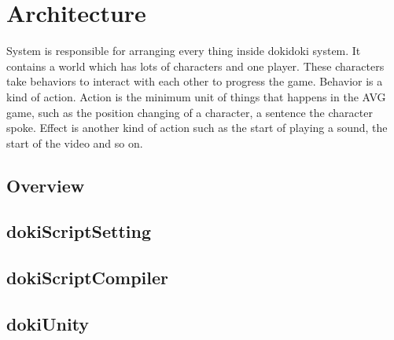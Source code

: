 \chapter{Architecture}

System is responsible for arranging every thing inside dokidoki system. It contains a world which has lots of characters and one player. These characters take behaviors to interact with each other to progress the game. Behavior is a kind of action. Action is the minimum unit of things that happens in the AVG game, such as the position changing of a character, a sentence the character spoke. Effect is another kind of action such as the start of playing a sound, the start of the video and so on.

\section{Overview}

\section{dokiScriptSetting}

\section{dokiScriptCompiler}

\section{dokiUnity}